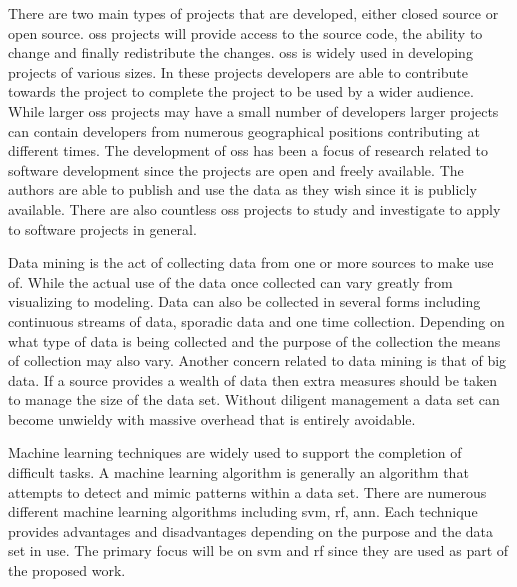
There are two main types of projects that are developed, either closed source or open source. \gls{oss} projects will provide access to the source code, the ability to change and finally redistribute the changes. \gls{oss} is widely used in developing projects of various sizes. In these projects developers are able to contribute towards the project to complete the project to be used by a wider audience. While larger \gls{oss} projects may have a small number of developers larger projects can contain developers from numerous geographical positions contributing at different times. The development of \gls{oss} has been a focus of research related to software development since the projects are open and freely available. The authors are able to publish and use the data as they wish since it is publicly available. There are also countless \gls{oss} projects to study and investigate to apply to software projects in general.


Data mining is the act of collecting data from one or more sources to make use of. While the actual use of the data once collected can vary greatly from visualizing to modeling. Data can also be collected in several forms including continuous streams of data, sporadic data and one time collection. Depending on what type of data is being collected and the purpose of the collection the means of collection may also vary. Another concern related to data mining is that of big data. If a source provides a wealth of data then extra measures should be taken to manage the size of the data set. Without diligent management a data set can become unwieldy with massive overhead that is entirely avoidable.


Machine learning techniques are widely used to support the completion of difficult tasks. A machine learning algorithm is generally an algorithm that attempts to detect and mimic patterns within a data set. There are numerous different machine learning algorithms including \gls{svm}, \gls{rf}, \gls{ann}. Each technique provides advantages and disadvantages depending on the purpose and the data set in use. The primary focus will be on \gls{svm} and \gls{rf} since they are used as part of the proposed work. 

